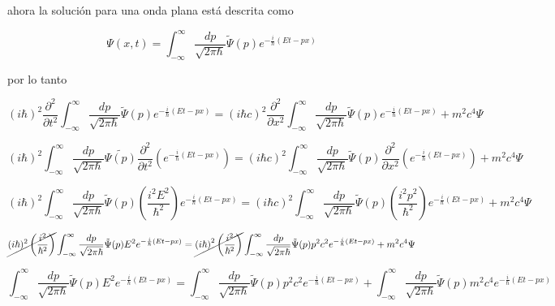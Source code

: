 \documentclass[12pt,a4paper]{article}
\begin{document}
\begin{enumerate}
    ahora la solución para una onda plana está descrita como
    
    \begin{equation*}
        \Psi (x,t) = \int_{-\infty}^{\infty} \frac{dp}{\sqrt{2 \pi \hbar}} \tilde{\Psi}(p) e^{-\frac{i}{\hbar}(Et-px)}
    \end{equation*}
    
    por lo tanto
    
    \begin{equation*}
        (i \hbar)^2\frac{\partial^2 }{\partial t^2} \int_{-\infty}^{\infty} \frac{dp}{\sqrt{2 \pi \hbar}} \tilde{\Psi}(p) e^{-\frac{i}{\hbar}(Et-px)} = \left(i\hbar c\right)^2\frac{\partial^2}{\partial x^2} \int_{-\infty}^{\infty} \frac{dp}{\sqrt{2 \pi \hbar}} \tilde{\Psi}(p) e^{-\frac{i}{\hbar}(Et-px)} + m^2 c^4 \Psi
    \end{equation*}
    
    \begin{equation*}
        (i \hbar)^2 \int_{-\infty}^{\infty} \frac{dp}{\sqrt{2 \pi \hbar}} \tilde{\Psi(p)} \frac{\partial^2 }{\partial t^2}(e^{-\frac{i}{\hbar}(Et-px)}) = \left(i\hbar c\right)^2 \int_{-\infty}^{\infty} \frac{dp}{\sqrt{2 \pi \hbar}} \tilde{\Psi}(p) \frac{\partial^2}{\partial x^2}(e^{-\frac{i}{\hbar}(Et-px)}) + m^2 c^4 \Psi
    \end{equation*}
    
    \begin{equation*}
        (i \hbar)^2 \int_{-\infty}^{\infty} \frac{dp}{\sqrt{2 \pi \hbar}} \tilde{\Psi}(p)\left(\frac{i^2E^2}{\hbar^2}\right) e^{-\frac{i}{\hbar}(Et-px)} = \left(i\hbar c\right)^2 \int_{-\infty}^{\infty} \frac{dp}{\sqrt{2 \pi \hbar}} \tilde{\Psi}(p) \left(\frac{i^2p^2}{\hbar^2}\right)e^{-\frac{i}{\hbar}(Et-px)} + m^2 c^4 \Psi
    \end{equation*}
    
    
    \begin{equation*}
        \cancel{(i \hbar)^2 \left(\frac{i^2}{\hbar^2}\right)}\int_{-\infty}^{\infty} \frac{dp}{\sqrt{2 \pi \hbar}} \tilde{\Psi}(p) E^2 e^{-\frac{i}{\hbar}(Et-px)} = \cancel{\left(i\hbar \right)^2\left(\frac{i^2}{\hbar^2}\right)} \int_{-\infty}^{\infty} \frac{dp}{\sqrt{2 \pi \hbar}} \tilde{\Psi}(p)p^2c^2 e^{-\frac{i}{\hbar}(Et-px)} + m^2 c^4 \Psi
    \end{equation*}
    
    
    \begin{equation*}
        \int_{-\infty}^{\infty} \frac{dp}{\sqrt{2 \pi \hbar}} \tilde{\Psi}(p) E^2 e^{-\frac{i}{\hbar}(Et-px)} = \int_{-\infty}^{\infty} \frac{dp}{\sqrt{2 \pi \hbar}} \tilde{\Psi}(p)p^2c^2 e^{-\frac{i}{\hbar}(Et-px)} +  \int_{-\infty}^{\infty} \frac{dp}{\sqrt{2 \pi \hbar}} \tilde{\Psi}(p) m^2 c^4 e^{-\frac{i}{\hbar}(Et-px)}
    \end{equation*}
    

\end{enumerate}
\end{document}
